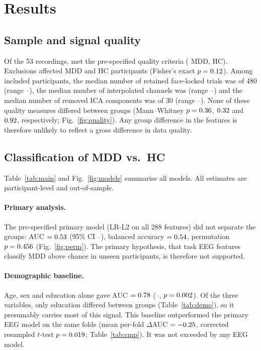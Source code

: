 \section{Results}

\subsection{Sample and signal quality}
Of the 53 recordings, \NIncluded{} met the pre-specified quality criteria (\NIncludedMDD{} MDD, \NIncludedHC{} HC).
Exclusions affected \NExcludedMDD{} MDD and \NExcludedHC{} HC participants (Fisher's exact $p=0.12$).
Among included participants, the median number of retained face-locked trials was \MedianTrials{} of 480
(range \MinTrials--\MaxTrials), the median number of interpolated channels was \MedianBadCh{} (range
\MinBadCh--\MaxBadCh) and the median number of removed ICA components was \MedianIca{} of 30 (range \MinIca--\MaxIca).
None of these quality measures differed between groups (Mann--Whitney $p=0.36$,
$0.32$ and $0.92$, respectively; Fig.~\ref{fig:quality}). Any group difference in the
features is therefore unlikely to reflect a gross difference in data quality.

\subsection{Classification of MDD vs.\ HC}
Table~\ref{tab:main} and Fig.~\ref{fig:models} summarise all models. All estimates are participant-level and
out-of-sample.

\paragraph{Primary analysis.} The pre-specified primary model (LR-L2 on all 288 features) did not separate the
groups: AUC $=0.53$ (95\% CI \PrimaryLrLAllAucLo--\PrimaryLrLAllAucHi), balanced accuracy
$=0.54$, permutation $p=0.456$ (Fig.~\ref{fig:perm}). The primary hypothesis,
that task EEG features classify MDD above chance in unseen participants, is therefore not supported.

\paragraph{Demographic baseline.} Age, sex and education alone gave AUC $=0.78$
(\DemographicsLrAucLo--\DemographicsLrAucHi, $p=0.002$). Of the three variables, only education differed between groups
(Table~\ref{tab:demo}), so it presumably carries most of this signal. This baseline outperformed the primary EEG model on the same folds (mean per-fold
$\Delta$AUC $=-0.25$, corrected resampled $t$-test $p=0.019$;
Table~\ref{tab:cmp}). It was not exceeded by any EEG model.

